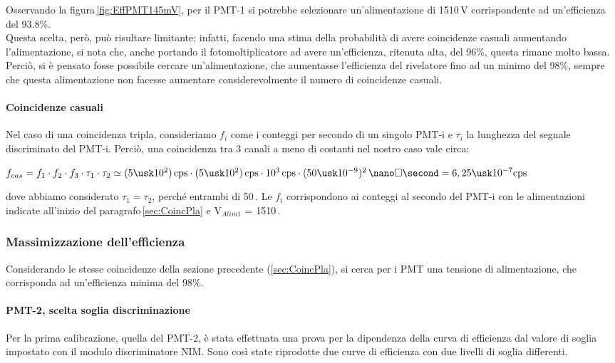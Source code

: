 \documentclass[a4paper,twocolumn]{article}
\begin{document}
Osservando la figura\,\ref{fig:EffPMT145mV}, per il PMT-1 si potrebbe selezionare un'alimentazione di 1510\,V corrispondente ad un'efficienza del 93.8$\%$.\\
Questa scelta, però, può risultare limitante; infatti, facendo una stima della probabilità di avere coincidenze casuali aumentando l'alimentazione, si nota che, anche portando il fotomoltiplicatore ad avere un'efficienza, ritenuta alta, del 96$\%$, questa rimane molto bassa. Perciò, si è pensato fosse possibile cercare un'alimentazione, che aumentasse l'efficienza del rivelatore fino ad un minimo del 98$\%$, sempre che questa alimentazione non facesse aumentare considerevolmente il numero di coincidenze casuali.

\paragraph{Coincidenze casuali}
Nel caso di una coincidenza tripla, consideriamo $f_i$ come i conteggi per secondo di un singolo PMT-i e $\tau_i$ la lunghezza del segnale discriminato del PMT-i. Perciò, una coincidenza tra 3 canali a meno di costanti nel nostro caso vale circa:

\begin{center}
$f_{cas} = f_1 \cdot f_2 \cdot f_3 \cdot \tau _1 \cdot \tau _2 \simeq (5\usk10^2)\,\textnormal{cps} \cdot (5\usk 10^2)\,\textnormal{cps} \cdot 10^3\,\textnormal{cps} \cdot (50\usk10^{-9})^2\,\nano\square\second = 6,25\usk10^{-7} \textnormal{cps}$
\end{center}

dove abbiamo considerato $\tau_1 = \tau_2$, perché entrambi di 50\,\nano\second. Le $f_i$ corrispondono ai conteggi al secondo del PMT-i con le alimentazioni indicate all'inizio del paragrafo\,\ref{sec:CoincPla} e V$_{Alim1}$ = 1510\,\volt. 

\subsubsection{Massimizzazione dell'efficienza}
\label{sec:CoincMax}
Considerando le stesse coincidenze della sezione precedente (\ref{sec:CoincPla}), si cerca per i PMT una tensione di alimentazione, che corrisponda ad un'efficienza minima del 98$\%$.

\paragraph{PMT-2, scelta soglia discriminazione}
Per la prima calibrazione, quella del PMT-2, è stata effettuata una prova per la dipendenza della curva di efficienza dal valore di soglia impostato con il modulo discriminatore NIM. Sono così state riprodotte due curve di efficienza con due livelli di soglia differenti.
\end{document}
